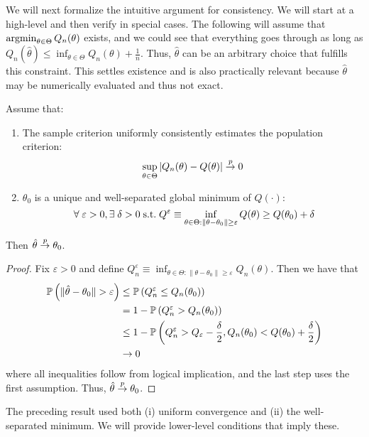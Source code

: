 \documentclass[10pt]{article}
\begin{document}
\begin{remark}
	We will next formalize the intuitive argument for consistency. We will start at a high-level and then verify in special cases. The following will assume that $\mathop{\rm argmin}_{\theta\in\Theta} Q_n(\theta)$ exists, and we could see that everything goes through as long as $Q_n(\hat{\theta}) \le \inf_{\theta\in\Theta} Q_n(\theta) + \frac{1}{n}$. Thus, $\hat{\theta}$ can be an arbitrary choice that fulfills this constraint. This settles existence and is also practically relevant because $\hat{\theta}$ may be numerically evaluated and thus not exact. 
\end{remark}

\begin{theorem} 
	Assume that:
	\begin{enumerate}
		\item The sample criterion uniformly consistently estimates the population criterion: \[\sup_{\theta\in\Theta} |Q_n(\theta) - Q(\theta) | \overset{p}{\to} 0\]
		\item $\theta_0$ is a unique and well-separated global minimum of $Q(\cdot)$: \[\forall \varepsilon > 0, \exists \delta > 0 \st Q^\varepsilon \equiv \inf_{\theta \in \Theta : \|\theta - \theta_0\|\ge \varepsilon} Q(\theta) \ge Q(\theta_0) + \delta\]
	\end{enumerate}
	Then $\hat{\theta} \overset{p}{\to} \theta_0$.
\end{theorem}
\begin{proof}
	Fix $\varepsilon > 0$ and define $Q_n^\varepsilon \equiv \inf_{\theta \in \Theta : \|\theta - \theta_0\| \ge \varepsilon} Q_n(\theta)$. Then we have that \begin{align*} \mathbb{P} \left( \|\hat{\theta} - \theta_0\| > \varepsilon \right) &\le \mathbb{P}\left( Q_n^\varepsilon \le Q_n(\theta_0)\right) \\ &= 1 - \mathbb{P} \left( Q_n^\varepsilon > Q_n(\theta_0)\right) \\ &\le 1 - \mathbb{P}\left( Q_n^\varepsilon > Q_\varepsilon - \frac{\delta}{2},Q_n(\theta_0) < Q(\theta_0) + \frac{\delta}{2}\right) \\ &\to 0 \end{align*} where all inequalities follow from logical implication, and the last step uses the first assumption. Thus, $\hat{\theta} \overset{p}{\to} \theta_0$.
\end{proof}

\begin{remark}
	The preceding result used both (i) uniform convergence and (ii) the well-separated minimum. We will provide lower-level conditions that imply these.
\end{remark}
\end{document}

